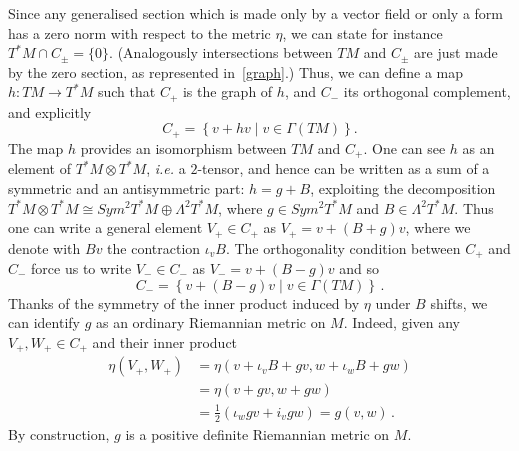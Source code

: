 \documentclass[debug]{phd}
\begin{document}
						Since any generalised section which is made only by a vector field or only a form has a zero norm with respect to the metric $\eta$, we can state for instance $T^*M \cap C_{\pm} = \{0\}$. (Analogously intersections between $TM$ and $C_{\pm}$ are just made by the zero section, as represented in~\cref{graph}.)
						Thus, we can define a map $h : TM \longrightarrow T^*M$ such that $C_{+}$ is the graph of $h$, and $C_{-}$ its orthogonal complement, and explicitly
								\begin{equation}\label{cplus}
									C_{+} = \left\{v+ hv \mid v \in \Gamma\left(TM\right)\right\}.
								\end{equation}
						The map $h$ provides an isomorphism between $TM$ and $C_{+}$.						
						One can see $h$ as an element of $T^*M \otimes T^*M$, \emph{i.e.} a $2$-tensor, and hence can be written as a sum of a symmetric and an antisymmetric part: $h=g+B$, exploiting the decomposition $T^*M \otimes T^*M \cong Sym^2 T^*M \oplus \Lambda^2 T^*M$, where $g \in Sym^2 T^*M$ and $B \in \Lambda^2 T^*M$. 
						Thus one can write a general element $V_{+} \in C_{+}$ as $V_{+} = v + \left(B + g \right)v$, where we denote with $Bv$ the contraction $\iota_v B$. 
						The orthogonality condition between $C_{+}$ and $C_{-}$ force us to write $V_{-} \in C_{-}$ as $V_{-} = v + \left(B - g \right)v$ and so
								\begin{equation}\label{cminus}
									C_{-} = \left\{v+ \left(B-g\right)v \mid v \in \Gamma\left(TM\right)\right\} \, .
								\end{equation}
						Thanks of the symmetry of the inner product induced by $\eta$ under $B$ shifts, we can identify $g$ as an ordinary Riemannian metric on $M$.
						Indeed, given any $V_{+}, W_{+} \in C_{+}$ and their inner product
								\begin{equation*}
									\begin{split}
										\eta \left( V_{+}, W_{+} \right) 	& = \eta( v + \iota_v B + g v , w + \iota_w B + g w ) \\
 																& = \eta( v + gv , w + gw ) \\
 																& = \frac{1}{2} \left( \iota_w g v + i_v g w \right) = g\left(v,w\right)\, .
									\end{split}
								\end{equation*}
						By construction, $g$ is a positive definite Riemannian metric on $M$.
						
\end{document}
